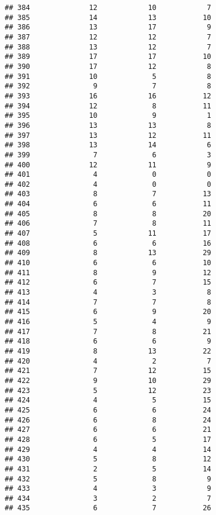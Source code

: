 \documentclass[
]{article}
\begin{document}
\begin{verbatim}
## 384              12            10            7
## 385              14            13           10
## 386              13            17            9
## 387              12            12            7
## 388              13            12            7
## 389              17            17           10
## 390              17            12            8
## 391              10             5            8
## 392               9             7            8
## 393              16            16           12
## 394              12             8           11
## 395              10             9            1
## 396              13            13            8
## 397              13            12           11
## 398              13            14            6
## 399               7             6            3
## 400              12            11            9
## 401               4             0            0
## 402               4             0            0
## 403               8             7           13
## 404               6             6           11
## 405               8             8           20
## 406               7             8           11
## 407               5            11           17
## 408               6             6           16
## 409               8            13           29
## 410               6             6           10
## 411               8             9           12
## 412               6             7           15
## 413               4             3            8
## 414               7             7            8
## 415               6             9           20
## 416               5             4            9
## 417               7             8           21
## 418               6             6            9
## 419               8            13           22
## 420               4             2            7
## 421               7            12           15
## 422               9            10           29
## 423               5            12           23
## 424               4             5           15
## 425               6             6           24
## 426               6             8           24
## 427               6             6           21
## 428               6             5           17
## 429               4             4           14
## 430               5             8           12
## 431               2             5           14
## 432               5             8            9
## 433               4             3            9
## 434               3             2            7
## 435               6             7           26

\end{verbatim}
\end{document}
